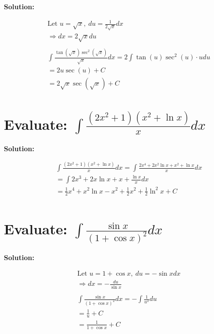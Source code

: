 \documentclass{article}
\begin{document}
\textbf{Solution:}

\begin{align*}
     & \text{Let }  u = \sqrt{x}, \ du = \frac{1}{2\sqrt{x}} dx                                       \\
     & \Rightarrow dx = 2\sqrt{x} du                                                                  \\
    \\
     & \int \frac{\tan(\sqrt{x}) \sec^2(\sqrt{x})}{\sqrt{x}} dx = 2 \int \tan(u) \sec^2(u) \cdot u du \\
     & = 2u \sec(u) + C                                                                               \\
     & = 2\sqrt{x} \sec(\sqrt{x}) + C
\end{align*}

\newpage
\section{Evaluate: $\int \frac{(2x^2 + 1)(x^2 + \ln x)}{x} dx$}

\textbf{Solution:}

\begin{align*}
     & \int \frac{(2x^2 + 1)(x^2 + \ln x)}{x} dx = \int \frac{2x^4 + 2x^2 \ln x + x^2 + \ln x}{x} dx \\
     & = \int 2x^3 + 2x \ln x + x + \frac{\ln x}{x} dx                                               \\
     & = \frac{1}{2} x^4 + x^2 \ln x - x^2 + \frac{1}{2} x^2 + \frac{1}{2} \ln^2 x + C               \\
\end{align*}

\section{Evaluate: $\int \frac{\sin x}{(1 + \cos x)^2} dx$}

\textbf{Solution:}

\begin{align*}
     & \text{Let } u = 1 + \cos x, \ du = -\sin x dx                  \\
     & \Rightarrow dx = -\frac{du}{\sin x}                            \\
    \\
     & \int \frac{\sin x}{(1 + \cos x)^2} dx = -\int \frac{1}{u^2} du \\
     & = \frac{1}{u} + C                                              \\
     & = {\frac{1}{1 + \cos x} + C}
\end{align*}
\end{document}
